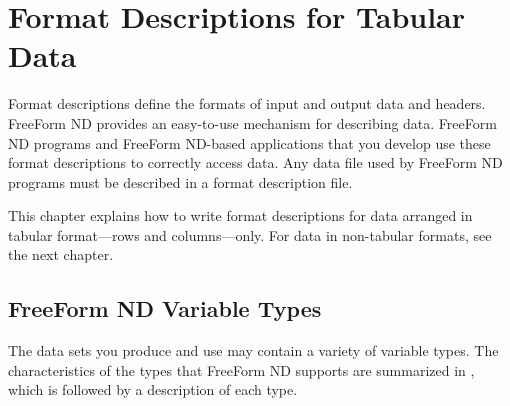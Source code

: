 %
%

\chapter{Format Descriptions for Tabular Data}
\label{ff,tblfmt}

Format descriptions define the formats of input and output data and
headers. FreeForm ND provides an easy-to-use mechanism for describing
data. FreeForm ND programs and FreeForm ND-based applications that you
develop use these format descriptions to correctly access data. Any
data file used by FreeForm ND programs must be described in a format
description file.

This chapter explains how to write format descriptions for data
arranged in tabular format---rows and columns---only. For data in
non-tabular formats, see the next chapter.

\section{FreeForm ND Variable Types}
\label{ff,tblfmt,vartypes}

The data sets you produce and use may contain a variety of variable
types. The characteristics of the types that FreeForm ND supports are
summarized in , which is followed by a
description of each type.


